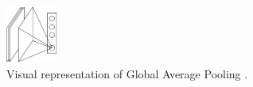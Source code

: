 \begin{figure}[H]
    \centering
    \includegraphics[width=0.15\textwidth]{fig/rel/images/gap_fix.pdf}
    \caption{Visual representation of Global Average Pooling \autocite{lin2013network}.}
    \label{fig:rel_gap}
\end{figure}